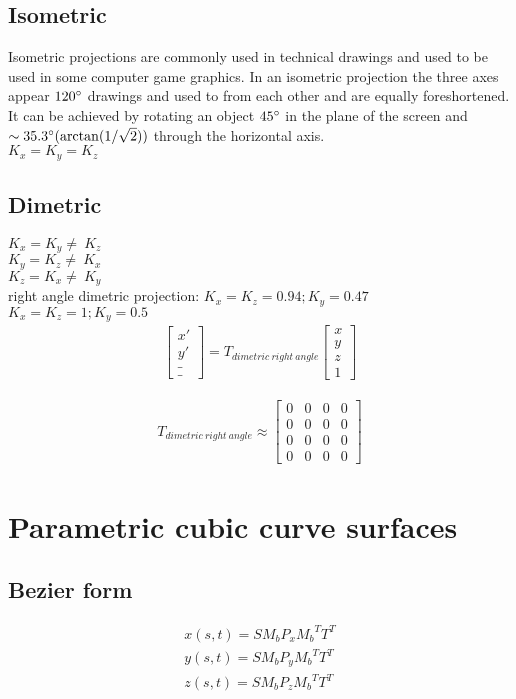 \documentclass{article}
\begin{document}
\clearpage
\subsection{Isometric}
Isometric projections are commonly used in technical drawings and used to be used in some computer game graphics.
In an isometric projection the three axes appear $120\degree$ drawings and used to from each other and are equally foreshortened.
It can be achieved by rotating an object $45 \degree$ in the plane of the screen and $\sim 35.3 \degree (\arctan (1 / \sqrt 2))$ through the horizontal axis.
\\$K_x = K_y = K_z$
\subsection{Dimetric}
$K_x = K_y \neq~K_z$
\\$K_y = K_z \neq~K_x$
\\$K_z = K_x \neq~K_y$
\\right angle dimetric projection: $K_x = K_z = 0.94; K_y = 0.47$
\\$K_x = K_z = 1; K_y = 0.5$
\\
\begin{gather}
	\begin{bmatrix}
		x'\\
		y'\\
		\_\\
		\_
	\end{bmatrix}
	= T_{dimetric~right~angle}
	\begin{bmatrix}
		x\\
		y\\
		z\\
		1
	\end{bmatrix}
\end{gather}
  
\begin{gather}
	T_{dimetric~right~angle}
	\approx 
	\begin{bmatrix}
		0 & 0 & 0 & 0\\
		0 & 0 & 0 & 0\\
		0 & 0 & 0 & 0\\
		0 & 0 & 0 & 0
	\end{bmatrix}
\end{gather}
 
\clearpage

\section{Parametric cubic curve surfaces}
\subsection{Bezier form}

\begin{gather}
	x(s, t) = S M_b P_x {M_b}^T T^T\\
	y(s, t) = S M_b P_y {M_b}^T T^T\\
	z(s, t) = S M_b P_z {M_b}^T T^T
\end{gather}
\end{document}

